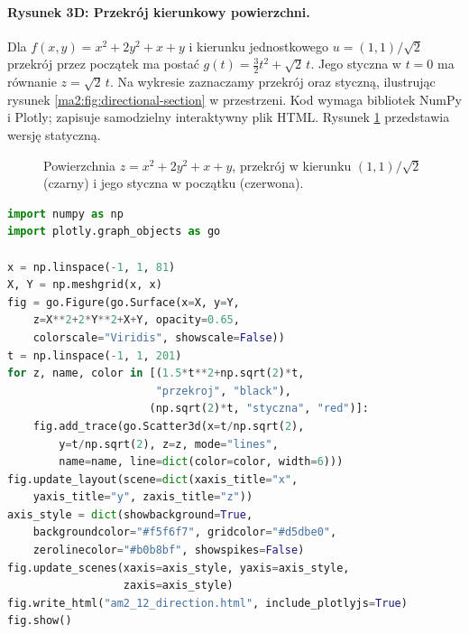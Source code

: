 \paragraph{Rysunek 3D: Przekrój kierunkowy powierzchni.}
Dla $f(x,y)=x^2+2y^2+x+y$ i kierunku jednostkowego
$u=(1,1)/\sqrt2$ przekrój przez początek ma postać
$g(t)=\frac32t^2+\sqrt2\,t$. Jego styczna w $t=0$
ma równanie $z=\sqrt2\,t$. Na wykresie zaznaczamy
przekrój oraz styczną, ilustrując rysunek
\ref{ma2:fig:directional-section} w przestrzeni.
Kod wymaga bibliotek NumPy i Plotly; zapisuje samodzielny
interaktywny plik HTML.
Rysunek \ref{ma2:fig:directional-surface} przedstawia wersję statyczną.

\begin{figure}[htbp]
\centering
{}
\caption{Powierzchnia $z=x^2+2y^2+x+y$, przekrój w kierunku $(1,1)/\sqrt2$ (czarny) i jego styczna w początku (czerwona).}
\label{ma2:fig:directional-surface}
\end{figure}

\begin{lstlisting}[language=Python]
import numpy as np
import plotly.graph_objects as go

x = np.linspace(-1, 1, 81)
X, Y = np.meshgrid(x, x)
fig = go.Figure(go.Surface(x=X, y=Y,
    z=X**2+2*Y**2+X+Y, opacity=0.65,
    colorscale="Viridis", showscale=False))
t = np.linspace(-1, 1, 201)
for z, name, color in [(1.5*t**2+np.sqrt(2)*t,
                       "przekroj", "black"),
                      (np.sqrt(2)*t, "styczna", "red")]:
    fig.add_trace(go.Scatter3d(x=t/np.sqrt(2),
        y=t/np.sqrt(2), z=z, mode="lines",
        name=name, line=dict(color=color, width=6)))
fig.update_layout(scene=dict(xaxis_title="x",
    yaxis_title="y", zaxis_title="z"))
axis_style = dict(showbackground=True,
    backgroundcolor="#f5f6f7", gridcolor="#d5dbe0",
    zerolinecolor="#b0b8bf", showspikes=False)
fig.update_scenes(xaxis=axis_style, yaxis=axis_style,
                  zaxis=axis_style)
fig.write_html("am2_12_direction.html", include_plotlyjs=True)
fig.show()
\end{lstlisting}

